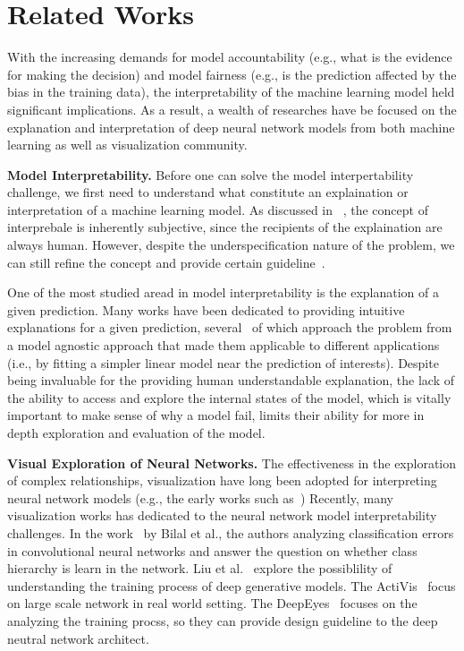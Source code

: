 
\section{Related Works}
With the increasing demands for model accountability (e.g., what is the evidence for making the decision) and model fairness (e.g., is the prediction affected by the bias in the training data),
the interpretability of the machine learning model held significant implications. As a result, a wealth of researches have be focused on the explanation and interpretation of deep neural network models from both machine learning as well as visualization community.

\noindent\textbf{Model Interpretability.}
Before one can solve the model interpertability challenge, we first need to understand what constitute an explaination or interpretation of a machine learning model.
As discussed in ~\cite{Lipton2016, Doshi-Velez2017}, the concept of interprebale is inherently subjective, since the recipients of the explaination are always human.
However, despite the underspecification nature of the problem, we can still refine the concept and provide certain guideline~\cite{Doshi-Velez2017}.

One of the most studied aread in model interpretability is the explanation of a given prediction.
Many works have been dedicated to providing intuitive explanations for a given prediction, several~\cite{RibeiroSinghGuestrin2016, KrausePererNg2016} of which approach the problem from a model agnostic approach that made them applicable to different applications (i.e., by fitting a simpler linear model near the prediction of interests).
%
Despite being invaluable for the providing human understandable explanation, the lack of the ability to access and explore the internal states of the model, which is vitally important to make sense of why a model fail, limits their ability for more in depth exploration and evaluation of the model.


\noindent\textbf{Visual Exploration of Neural Networks.}
The effectiveness in the exploration of complex relationships, visualization have long been adopted for interpreting neural network models (e.g., the early works such as~\cite{TzengMa2005})
Recently, many visualization works has dedicated to the neural network model interpretability challenges.
In the work~\cite{BilalJourablooYe2018} by Bilal et al., the authors analyzing classification errors in convolutional neural networks and answer the question on whether class hierarchy is learn in the network.
Liu et al.~\cite{LiuShiCao2018} explore the possiblility of understanding the training process of deep generative models.
The ActiVis~\cite{KahngAndrewsKalro2018} focus on large scale network in real world setting.
The DeepEyes~\cite{Pezzotti2018} focuses on the analyzing the training procss, so they can provide design guideline to the deep neutral network architect.

